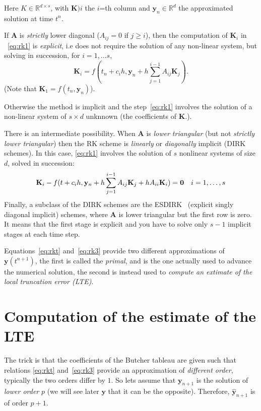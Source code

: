 \documentclass[10pt,a4paper,twoside]{article}
\begin{document}
Here $K\in\mathbb{R}^{d\times s}$, with $\mathbf{K})i$ the $i$=th column and $\mathbf{y}_n\in\mathbb{R}^d$ the approximated solution at time $t^n$.

If $\mathbf{A}$ is \emph{strictly} lower diagonal ($A_{ij}=0$ if $j\ge i$), then the  computation of $\mathbf{K}_i$ in ~\eqref{eq:rk1} is \emph{explicit}, i.e does not require the solution of any non-linear system, but solving in succession, for $i=1,\ldots s$,
\[
\mathbf{K}_i = f(t_n+c_ih,\mathbf{y}_n+h\sum_{j=1}^{i-1} A_{ij}\mathbf{K}_j).
\]
(Note that $\mathbf{K}_1=f(t_n,\mathbf{y}_n)$).

Otherwise the method is implicit and the step~\eqref{eq:rk1} involves the solution of a non-linear system of $s\times d$ unknnown (the coefficients of $\mathbf{K}$.).

There is an intermediate possibility. When $\mathbf{A}$ is \emph{lower triangular} (but not \emph{strictly lower triangular}) then the RK scheme is \emph{linearly} or \emph{diagonally} implicit
(DIRK schemes). In this case, \eqref{eq:rk1} involves the solution of $s$ nonlinear systems of size $d$, solved in succession:
\[
\mathbf{K}_i - f(t+c_ih,\mathbf{y}_n+h\sum_{j=1}^{i-1} A_{ij}\mathbf{K}_j +hA_{ii}\mathbf{K}_i)=\mathbf{0}\quad i=1,\ldots,s\\\label{eq:rk2ex}
\]
Finally, a subclass of the DIRK schemes are the ESDIRK~\cite{jorgensenFamilyESDIRKIntegration2018} (explicit singly diagonal implicit) 
schemes, where $\mathbf{A}$ is lower triangular but the first row is zero. It means that the first stage is explicit and you have to solve only $s-1$ implicit stages at each time step. 
\smallskip

Equations~\eqref{eq:rkt} and~\eqref{eq:rk3} provide two different approximations of $\mathbf{y}(t^{n+1})$, the first is called the \emph{primal}, and is the one actually used to advance the numerical solution, the second is instead used to \emph{compute an extimate of the local truncation error (LTE)}.
\section{Computation of the estimate of the LTE}
The trick is that the coefficients of the Butcher tableau are given such that relations \eqref{eq:rkt} and~\eqref{eq:rk3} provide an approximation of \emph{different order}, typically the two orders differ by $1$. So lets assume that $\mathbf{y}_{n+1}$ is the solution of \emph{lower order} $p$ (we will see later $\mathbf{y}$ that it can be the opposite). Therefore, $\hat{\mathbf{y}}_{n+1}$ is of order $p+1$. 
\end{document}
